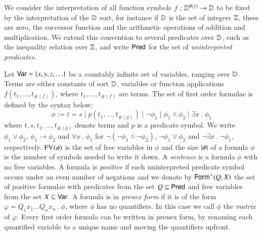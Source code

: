 We consider the interpretation of all function symbols $f :
\mathbb{D}^{\#(f)} \rightarrow \mathbb{D}$ to be fixed by the interpretation of
the $\mathbb{D}$ sort, for instance if $\mathbb{D}$ is the set of integers
${\bf \mathbb{Z}}$, these are zero, the successor function and the arithmetic
operations of addition and multiplication. We extend this convention
to several predicates over $\mathbb{D}$, such as the inequality relation
over ${\bf \mathbb{Z}}$, and write $\mathsf{Pred}$ for the set of \emph{uninterpreted
  predicates}.

Let $\mathsf{Var} = \{ x,y,z,\ldots \}$ be a countably infinite set of
variables, ranging over $\mathbb{D}$. Terms are either constants of sort
$\mathbb{D}$, variables or function applications $f(t_1,\ldots,t_{\#(f)})$,
where $t_1,\ldots,t_{\#(f)}$ are terms. The set of first order
formulae is defined by the syntax below:
\[\phi := t = s \mid p(t_1,\ldots,t_{\#(p)}) 
\mid \neg \phi_1 \mid \phi_1 \wedge \phi_2 \mid \exists x ~.~
\phi_1 \] where $t,s,t_1,\ldots,t_{\#(p)}$ denote terms and $p$ is a
predicate symbol. We write $\phi_1 \vee \phi_2$, $\phi_1 \rightarrow
\phi_2$ and $\forall x ~.~ \phi_1$ for $\neg(\neg\phi_1 \wedge
\neg\phi_2)$, $\neg\phi_1 \vee \phi_2$ and $\neg\exists x ~.~
\neg\phi_1$, respectively. $\mathrm{FV}_{}(\phi)$ is the set of free variables
in $\phi$ and the size ${|{\phi}|}$ of a formula $\phi$ is the number
of symbols needed to write it down. A \emph{sentence} is a formula
$\phi$ with no free variables. A formula is \emph{positive} if each
uninterpreted predicate symbol occurs under an even number of
negations and we denote by $\mathsf{Form}^+(Q,X)$ the set of positive
formulae with predicates from the set $Q \subseteq \mathsf{Pred}$ and free
variables from the set $X \subseteq \mathsf{Var}$. A formula is in
\emph{prenex form} if it is of the form $\varphi = Q_1x_1 \ldots
Q_nx_n ~.~ \phi$, where $\phi$ has no quantifiers. In this case we
call $\phi$ the \emph{matrix} of $\varphi$. Every first order formula
can be written in prenex form, by renaming each quantified variable to
a unique name and moving the quantifiers upfront.


